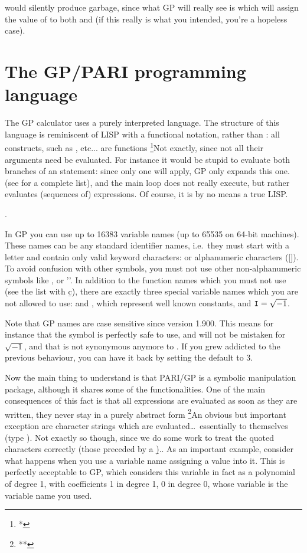 \noindent would silently produce garbage, since what GP will really see is
 which will assign the value of  to both  and
 (if this really is what you intended, you're a hopeless case).

\section{The GP/PARI programming language}

The GP calculator uses a purely interpreted language. The structure of this
language is reminiscent of LISP with a functional notation, 
rather than : all  constructs, such as
,  etc... are functions \footnote{*}{Not exactly, since
not all their arguments need be evaluated. For instance it would be stupid
to evaluate both branches of an  statement: since only one will
apply, GP only expands this one.} (see  for a
complete list), and the main loop does not really execute, but rather
evaluates (sequences of) expressions. Of course, it is by no means a true
LISP.

.

  In GP you can use up to 16383 variable names (up to 65535 on 64-bit
machines). These names can be any standard identifier names, i.e.~they must
start with a letter and contain only valid keyword characters: \kbd{\_} or
alphanumeric characters ([]). To avoid confusion with other
symbols, you must not use other non-alphanumeric symbols like \kbd{\$}, or
''. In addition to the function names which you must not use (see the
list with \b{c}), there are exactly three special variable names which you
are not allowed to use:  and , which represent well known
constants, and ${\tt I}=\sqrt{-1}$.

Note that GP names are case sensitive since version 1.900. This means for
instance that the symbol  is perfectly safe to use, and will not be
mistaken for $\sqrt{-1}$, and that  is not synonymous anymore to
. If you grew addicted to the previous behaviour, you can have it back
by setting the default  to $3$.

  Now the main thing to understand is that PARI/GP is  a symbolic
manipulation package, although it shares some of the functionalities. One of
the main consequences of this fact is that all expressions are evaluated as
soon as they are written, they never stay in a purely abstract form%
\footnote{**}{An obvious but important exception are character strings which
are evaluated\dots\ essentially to themselves (type ). Not exactly
so though, since we do some work to treat the quoted characters correctly
(those preceded by a \b{)}.}.
%
As an important example, consider what happens when you use a variable name
 assigning a value into it. This is perfectly acceptable to GP,
which considers this variable in fact as a polynomial of degree 1, with
coefficients 1 in degree 1, 0 in degree 0, whose variable is the variable
name you used.

